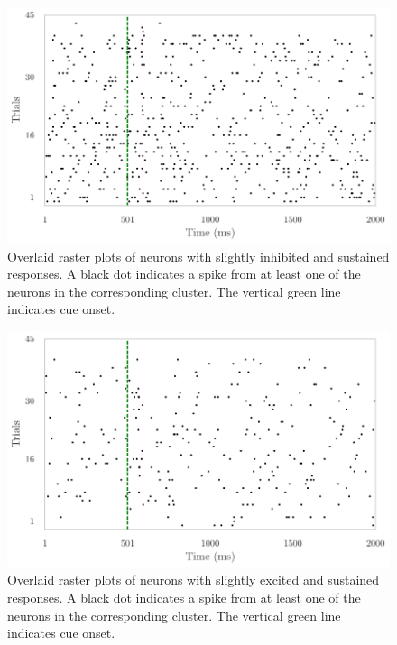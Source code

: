 \documentclass{article}
\begin{document}
\begin{figure}[H]
\begin{center}
\includegraphics[scale=1]{img/cue_7.pdf}
\end{center}
\caption{Overlaid raster plots of neurons with slightly inhibited and sustained responses. A black dot indicates a spike from at least one of the neurons in the corresponding cluster. The vertical green line indicates cue onset.}\label{cue7-raster}
\end{figure}

\begin{figure}[H]
\begin{center}
\includegraphics[scale=1]{img/cue_8.pdf}
\end{center}
\caption{Overlaid raster plots of neurons with slightly excited and sustained responses. A black dot indicates a spike from at least one of the neurons in the corresponding cluster. The vertical green line indicates cue onset.}\label{cue8-raster}
\end{figure}
\end{document}
